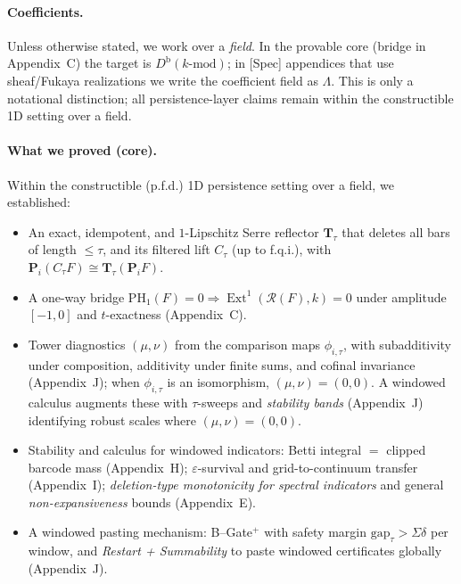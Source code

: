 \documentclass[11pt]{article}
\DeclareMathOperator{\Ext}{Ext}
\DeclareRobustCommand{\hyp}{\nobreakdash-}
\numberwithin{equation}{section}
\theoremstyle{definition}
\begin{document}
\paragraph{Coefficients.}
Unless otherwise stated, we work over a \emph{field}. In the provable core (bridge in Appendix~C) the target is \(D^{\mathrm{b}}(k\text{-mod})\); in [Spec] appendices that use sheaf/Fukaya realizations we write the coefficient field as \(\Lambda\). This is only a notational distinction; all persistence-layer claims remain within the constructible 1D setting over a field.

\paragraph{What we proved (core).}
Within the constructible (p.f.d.) 1D persistence setting over a field, we established:
\begin{itemize}
  \item An exact, idempotent, and \(1\)\hyp Lipschitz Serre reflector \(\mathbf{T}_\tau\) that deletes all bars of length \(\le\tau\), and its filtered lift \(C_\tau\) (up to f.q.i.), with \(\mathbf{P}_i(C_\tau F)\cong \mathbf{T}_\tau(\mathbf{P}_iF)\).
  \item A one\hyp way bridge \(\mathrm{PH}_1(F)=0 \Rightarrow \Ext^1(\mathcal{R}(F),k)=0\) under amplitude \([-1,0]\) and \(t\)\hyp exactness (Appendix~C).
  \item Tower diagnostics \((\mu,\nu)\) from the comparison maps \(\phi_{i,\tau}\), with subadditivity under composition, additivity under finite sums, and cofinal invariance (Appendix~J); when \(\phi_{i,\tau}\) is an isomorphism, \((\mu,\nu)=(0,0)\). A windowed calculus augments these with \(\tau\)\hyp sweeps and \emph{stability bands} (Appendix~J) identifying robust scales where \((\mu,\nu)=(0,0)\).
  \item Stability and calculus for windowed indicators: Betti integral \(=\) clipped barcode mass (Appendix~H); \(\varepsilon\)\hyp survival and grid\hyp to\hyp continuum transfer (Appendix~I); \emph{deletion\hyp type monotonicity for spectral indicators} and general \emph{non\hyp expansiveness} bounds (Appendix~E).
  \item A windowed pasting mechanism: B–Gate\(^{+}\) with safety margin \(\mathrm{gap}_\tau>\Sigma\delta\) per window, and \emph{Restart + Summability} to paste windowed certificates globally (Appendix~J).
\end{itemize}
\end{document}
